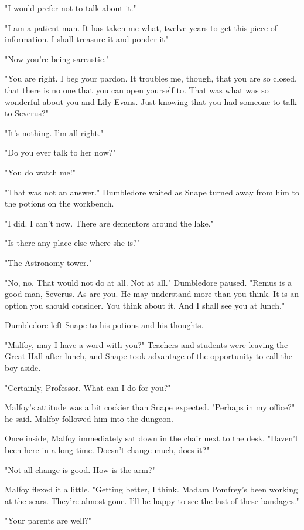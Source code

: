 "I would prefer not to talk about it."

"I am a patient man. It has taken me what, twelve years to get this piece of information. I shall treasure it and ponder it{\el}"

"Now you're being sarcastic."

"You are right. I beg your pardon. It troubles me, though, that you are so closed, that there is no one that you can open yourself to. That was what was so wonderful about you and Lily Evans. Just knowing that you had someone to talk to{\el} Severus?"

"It's nothing. I'm all right."

"Do you ever talk to her now?"

"You do watch me!"

"That was not an answer." Dumbledore waited as Snape turned away from him to the potions on the workbench.

"I did. I can't now. There are dementors around the lake."

"Is there any place else where she is?"

"The Astronomy tower."

"No, no. That would not do at all. Not at all." Dumbledore paused. "Remus is a good man, Severus. As are you. He may understand more than you think. It is an option you should consider. You think about it. And I shall see you at lunch."

Dumbledore left Snape to his potions and his thoughts.

\sbreak

"Malfoy, may I have a word with you?" Teachers and students were leaving the Great Hall after lunch, and Snape took advantage of the opportunity to call the boy aside.

"Certainly, Professor. What can I do for you?"

Malfoy's attitude was a bit cockier than Snape expected. "Perhaps in my office?" he said. Malfoy followed him into the dungeon.

Once inside, Malfoy immediately sat down in the chair next to the desk. "Haven't been here in a long time. Doesn't change much, does it?"

"Not all change is good. How is the arm?"

Malfoy flexed it a little. "Getting better, I think. Madam Pomfrey's been working at the scars. They're almost gone. I'll be happy to see the last of these bandages."

"Your parents are well?"

